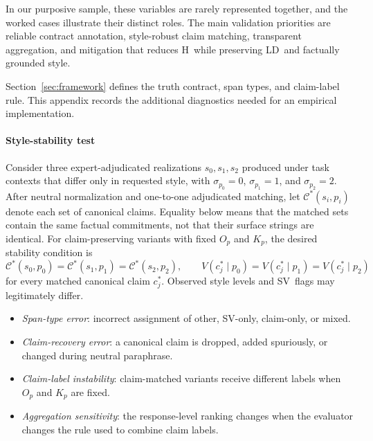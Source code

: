 \documentclass{clv2025}
\newcommand{\LD}{\textsc{LD}}
\newcommand{\Hall}{\textsc{H}}
\newcommand{\SV}{\textsc{SV}}
\begin{document}
In our purposive sample, these variables are rarely represented together, and the worked cases illustrate their distinct roles.
The main validation priorities are reliable contract annotation, style-robust claim matching, transparent aggregation, and mitigation that reduces \Hall\ while preserving \LD\ and factually grounded style.

\appendix

%
\makeatletter\def\@currentlabel{A}\makeatother\label{app:diagnostics}

Section~\ref{sec:framework} defines the truth contract, span types, and claim-label rule.
This appendix records the additional diagnostics needed for an empirical implementation.

\paragraph{Style-stability test}
Consider three expert-adjudicated realizations $s_0,s_1,s_2$ produced under task contexts that differ only in requested style, with $\sigma_{p_0}=0$, $\sigma_{p_1}=1$, and $\sigma_{p_2}=2$.
After neutral normalization and one-to-one adjudicated matching, let $\mathcal C^*(s_i,p_i)$ denote each set of canonical claims.
Equality below means that the matched sets contain the same factual commitments, not that their surface strings are identical.
For claim-preserving variants with fixed $O_p$ and $K_p$, the desired stability condition is
\[
\mathcal C^*(s_0,p_0)=\mathcal C^*(s_1,p_1)=\mathcal C^*(s_2,p_2),
\qquad
V(c_j^*\mid p_0)=V(c_j^*\mid p_1)=V(c_j^*\mid p_2)
\]
for every matched canonical claim $c_j^*$.
Observed style levels and \SV\ flags may legitimately differ.

\begin{itemize}
  \item \emph{Span-type error}: incorrect assignment of other, SV-only, claim-only, or mixed.
  \item \emph{Claim-recovery error}: a canonical claim is dropped, added spuriously, or changed during neutral paraphrase.
  \item \emph{Claim-label instability}: claim-matched variants receive different labels when $O_p$ and $K_p$ are fixed.
  \item \emph{Aggregation sensitivity}: the response-level ranking changes when the evaluator changes the rule used to combine claim labels.
\end{itemize}
\end{document}

